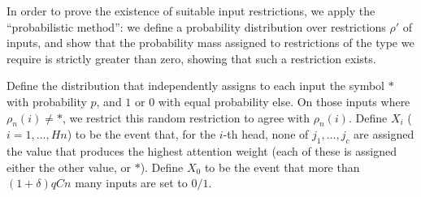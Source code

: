 \documentclass[11pt,a4paper]{article}
\begin{document}

In order to prove the existence of suitable input restrictions, we apply the ``probabilistic method'': we define a probability distribution over restrictions $\rho'$ of inputs, and show that the probability mass assigned to restrictions of the type we require is strictly greater than zero, showing that such a restriction exists.

Define the distribution that independently assigns to each input the symbol $*$ with probability $p$, and $1$ or $0$ with equal probability else.
On those inputs where $\rho_n(i) \neq *$, we restrict this random restriction to agree with $\rho_n(i)$.
Define $X_i$ ($i=1, ..., H n$) to be the event that, for the $i$-th head, none of $j_1, ..., j_c$ are assigned the value that produces the highest attention weight (each of these is assigned either the other value, or $*$).
Define $X_0$ to be the event that more than $(1+\delta)qCn$ many inputs are set to $0/1$.
\end{document}
